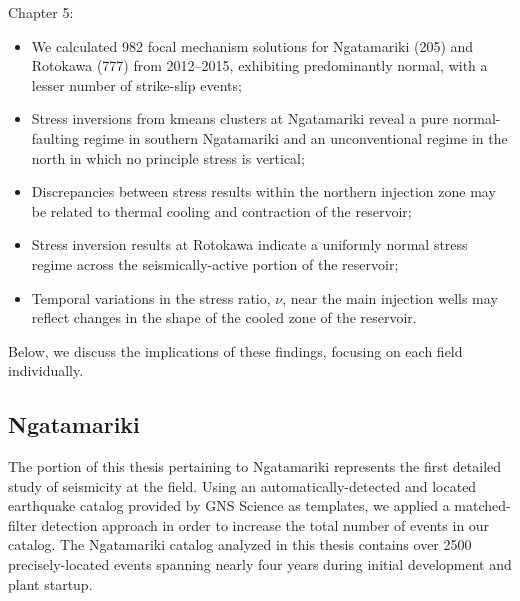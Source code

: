 \begin{flushleft}
Chapter 5:
\end{flushleft}
\begin{itemize}
    \item We calculated 982 focal mechanism solutions for Ngatamariki (205) and Rotokawa (777) from 2012--2015, exhibiting predominantly normal, with a lesser number of strike-slip events;
    \item Stress inversions from kmeans clusters at Ngatamariki reveal a pure normal-faulting regime in southern Ngatamariki and an unconventional regime in the north in which no principle stress is vertical;
    \item Discrepancies between stress results within the northern injection zone may be related to thermal cooling and contraction of the reservoir;
    \item Stress inversion results at Rotokawa indicate a uniformly normal stress regime across the seismically-active portion of the reservoir;
    \item Temporal variations in the stress ratio, $\nu$, near the main injection wells may reflect changes in the shape of the cooled zone of the reservoir.
\end{itemize}\par

Below, we discuss the implications of these findings, focusing on each field individually.

\subsection{Ngatamariki}
The portion of this thesis pertaining to Ngatamariki represents the first detailed study of seismicity at the field. Using an automatically-detected and located earthquake catalog provided by GNS Science as templates, we applied a matched-filter detection approach in order to increase the total number of events in our catalog. The Ngatamariki catalog analyzed in this thesis contains over 2500 precisely-located events spanning nearly four years during initial development and plant startup.

